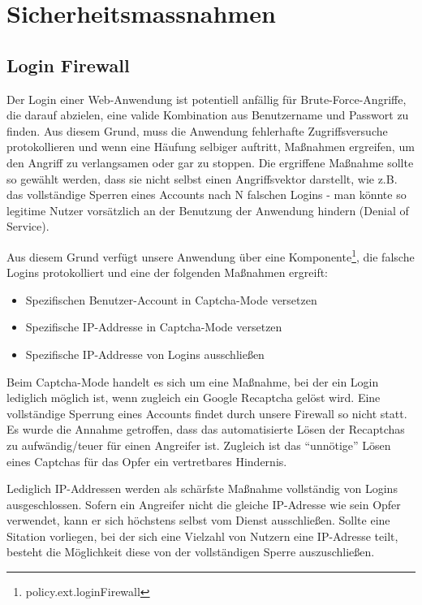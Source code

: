 \documentclass[12pt,DIV14,BCOR10mm,a4paper,parskip=half-,headsepline,headinclude,english,ngerman,bibliography=totocnumbered]{scrreprt}
\begin{document}
\chapter{Sicherheitsmassnahmen}

\section{Login Firewall}
Der Login einer Web-Anwendung ist potentiell anfällig für Brute-Force-Angriffe, die darauf abzielen, eine valide Kombination aus Benutzername und Passwort zu finden. Aus diesem Grund, muss die Anwendung fehlerhafte Zugriffsversuche protokollieren und wenn eine Häufung selbiger auftritt, Maßnahmen ergreifen, um den Angriff zu verlangsamen oder gar zu stoppen. Die ergriffene Maßnahme sollte so gewählt werden, dass sie nicht selbst einen Angriffsvektor darstellt, wie z.B. das vollständige Sperren eines Accounts nach N falschen Logins - man könnte so legitime Nutzer vorsätzlich an der Benutzung der Anwendung hindern (Denial of Service).

Aus diesem Grund verfügt unsere Anwendung über eine Komponente\footnote{policy.ext.loginFirewall}, die falsche Logins protokolliert und eine der folgenden Maßnahmen ergreift:

\begin{itemize}
\item Spezifischen Benutzer-Account in Captcha-Mode versetzen
\item Spezifische IP-Addresse in Captcha-Mode versetzen
\item Spezifische IP-Addresse von Logins ausschließen
\end{itemize}

Beim Captcha-Mode handelt es sich um eine Maßnahme, bei der ein Login lediglich möglich ist, wenn zugleich ein Google Recaptcha gelöst wird. Eine vollständige Sperrung eines Accounts findet durch unsere Firewall so nicht statt. Es wurde die Annahme getroffen, dass das automatisierte Lösen der Recaptchas zu aufwändig/teuer für einen Angreifer ist. Zugleich ist das \enquote{unnötige} Lösen eines Captchas für das Opfer ein vertretbares Hindernis.

Lediglich IP-Addressen werden als schärfste Maßnahme vollständig von Logins ausgeschlossen. Sofern ein Angreifer nicht die gleiche IP-Adresse wie sein Opfer verwendet, kann er sich höchstens selbst vom Dienst ausschließen. Sollte eine Sitation vorliegen, bei der sich eine Vielzahl von Nutzern eine IP-Adresse teilt, besteht die Möglichkeit diese von der vollständigen Sperre auszuschließen.
\end{document}
